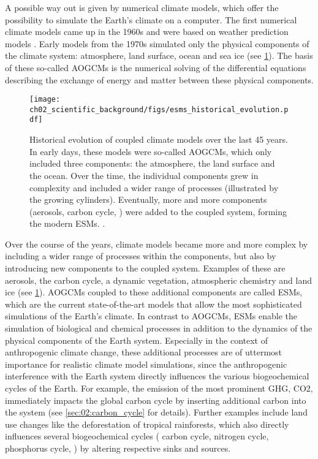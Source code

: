 A possible way out is given by numerical climate models, which offer the
possibility to simulate the Earth's climate on a computer. The first numerical
climate models came up in the 1960s and were based on weather prediction models
\autocite{Flato2011}. Early models from the 1970s simulated only the physical
components of the climate system: atmosphere, land surface, ocean and sea ice
(see \cref{fig:02:esms_historical_evolution}). The basis of these so-called
\acp{AOGCM} \autocite{Flato2013} is the numerical solving of the differential
equations describing the exchange of energy and matter between these physical
components.

\begin{figure}[t]
  \centering
  \texttt{[image: 
    ch02\_scientific\_background/figs/esms\_historical\_evolution.pdf]}
  \caption{Historical evolution of coupled climate models over the last 45
    years. In early days, these models were so-called \acfp{AOGCM}, which only
    included three components: the atmosphere, the land surface and the ocean.
    Over the time, the individual components grew in complexity and included a
    wider range of processes (illustrated by the growing cylinders).
    Eventually, more and more components (aerosols, carbon cycle, \etc{}) were
    added to the coupled system, forming the modern \acfp{ESM}.
    .}
  \label{fig:02:esms_historical_evolution}
\end{figure}

Over the course of the years, climate models became more and more complex by
including a wider range of processes within the components, but also by
introducing new components to the coupled system. Examples of these are
aerosols, the carbon cycle, a dynamic vegetation, atmospheric chemistry and
land ice (see \cref{fig:02:esms_historical_evolution}). \acp{AOGCM} coupled to
these additional components are called \acfp{ESM}, which are the current
state-of-the-art models that allow the most sophisticated simulations of the
Earth's climate. In contrast to \acp{AOGCM}, \acp{ESM} enable the simulation of
biological and chemical processes in addition to the dynamics of the physical
components of the Earth system. Especially in the context of anthropogenic
climate change, these additional processes are of uttermost importance for
realistic climate model simulations, since the anthropogenic interference with
the Earth system directly influences the various biogeochemical cycles of the
Earth. For example, the emission of the most prominent \ac{GHG}, \ac{CO2},
immediately impacts the global carbon cycle by inserting additional carbon into
the system (see \cref{sec:02:carbon_cycle} for details). Further examples
include land use changes like the deforestation of tropical rainforests, which
also directly influences several biogeochemical cycles (\eg{} carbon cycle,
nitrogen cycle, phosphorus cycle, \etc{}) by altering respective sinks and
sources.

